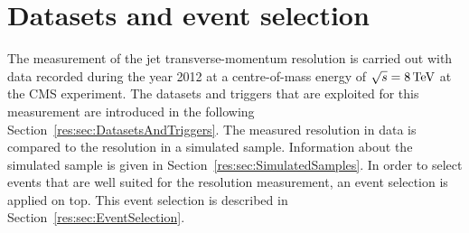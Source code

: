 \chapter{Datasets and event selection}

The measurement of the jet transverse-momentum resolution is carried out with \GAMJET data recorded during the year 2012 at a centre-of-mass energy of $\sqrt{s}=8\,\text{Te}\kern-0.06667em\text{V}$ at the CMS experiment.
The datasets and triggers that are exploited for this measurement are introduced in the following Section~\ref{res:sec:DatasetsAndTriggers}.
The measured resolution in data is compared to the resolution in a simulated \GAMJET sample. %
Information about the simulated sample is given in Section~\ref{res:sec:SimulatedSamples}.
In order to select \GAMJET events that are well suited for the resolution measurement, an event selection is applied on top.
This event selection is described in Section~\ref{res:sec:EventSelection}.

